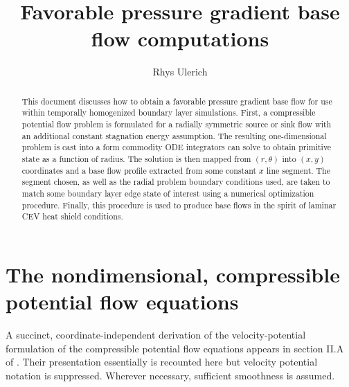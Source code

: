 \documentclass[letterpaper,11pt,nointlimits,reqno]{amsart}
\begin{document}
\title{Favorable pressure gradient base flow computations}
\author{Rhys Ulerich}

\begin{abstract}
This document discusses how to obtain a favorable pressure gradient base flow
for use within temporally homogenized boundary layer simulations.  First, a
compressible potential flow problem is formulated for a radially symmetric
source or sink flow with an additional constant stagnation energy assumption.
The resulting one-dimensional problem is cast into a form commodity ODE
integrators can solve to obtain primitive state as a function of radius.  The
solution is then mapped from $\left(r,\theta\right)$ into $\left(x,y\right)$
coordinates and a base flow profile extracted from some constant $x$ line
segment.  The segment chosen, as well as the radial problem boundary conditions
used, are taken to match some boundary layer edge state of interest using a
numerical optimization procedure.  Finally, this procedure is used to produce
base flows in the spirit of laminar CEV heat shield conditions.
\end{abstract}

\maketitle

\tableofcontents

\section{The nondimensional, compressible potential flow equations}

A succinct, coordinate-independent derivation of the velocity-potential
formulation of the compressible potential flow equations appears in section
II.A of \citet{Saad2011Coordinate}.  Their presentation essentially is
recounted here but velocity potential notation is suppressed.  Wherever
necessary, sufficient smoothness is assumed.
\end{document}
